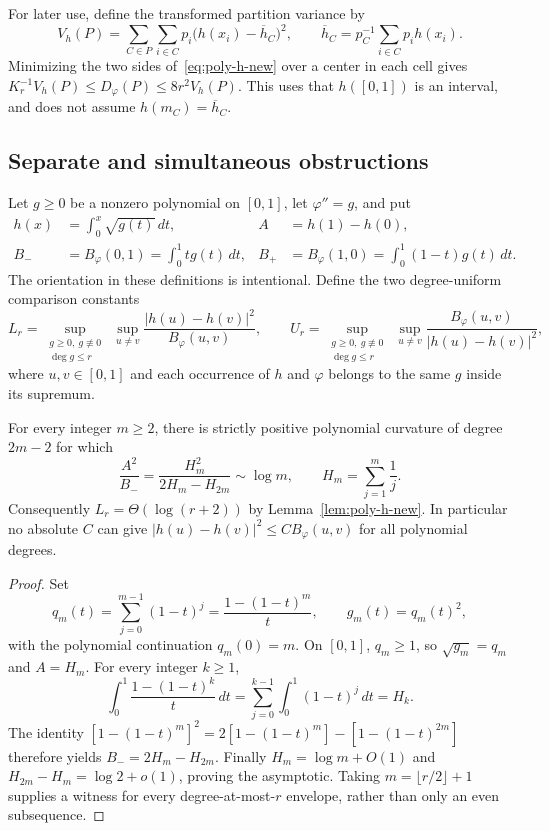 For later use, define the transformed partition variance by
\[
 V_h(P)=\sum_{C\in P}\sum_{i\in C}p_i
 \bigl(h(x_i)-\overline h_C\bigr)^2,\qquad
 \overline h_C=p_C^{-1}\sum_{i\in C}p_i h(x_i).
\]
Minimizing the two sides of~\eqref{eq:poly-h-new} over a center in
each cell gives $K_r^{-1}V_h(P)\le D_\varphi(P)\le8r^2V_h(P)$.
This uses that $h([0,1])$ is an interval, and does not assume
$h(m_C)=\overline h_C$.

\subsection{Separate and simultaneous obstructions}

Let $g\geq0$ be a nonzero polynomial on $[0,1]$, let
$\varphi''=g$, and put
\begin{align*}
 h(x)&=\int_0^x\sqrt{g(t)}\,dt,&
 A&=h(1)-h(0),\\
 B_-&=B_\varphi(0,1)=\int_0^1 t g(t)\,dt,&
 B_+&=B_\varphi(1,0)=\int_0^1(1-t)g(t)\,dt.
\end{align*}
The orientation in these definitions is intentional. Define the two
degree-uniform comparison constants
\[
 L_r=\sup_{\substack{g\geq0,\ g\not\equiv0\\\deg g\leq r}}
       \ \sup_{u\ne v}\frac{|h(u)-h(v)|^2}{B_\varphi(u,v)},
 \qquad
 U_r=\sup_{\substack{g\geq0,\ g\not\equiv0\\\deg g\leq r}}
       \ \sup_{u\ne v}\frac{B_\varphi(u,v)}{|h(u)-h(v)|^2},
\]
where $u,v\in[0,1]$ and each occurrence of $h$ and $\varphi$ belongs to
the same $g$ inside its supremum.

\begin{proposition}
For every integer $m\geq2$, there is strictly positive polynomial curvature
of degree $2m-2$ for which
\[
 \frac{A^2}{B_-}=\frac{H_m^2}{2H_m-H_{2m}}\sim\log m,
 \qquad H_m=\sum_{j=1}^m\frac1j.
\]
Consequently $L_r=\Theta(\log(r+2))$ by Lemma~\ref{lem:poly-h-new}. In particular no absolute $C$ can give
$|h(u)-h(v)|^2\leq C B_\varphi(u,v)$ for all polynomial degrees.
\end{proposition}
\begin{proof}
Set
\[
 q_m(t)=\sum_{j=0}^{m-1}(1-t)^j
       =\frac{1-(1-t)^m}{t},\qquad g_m(t)=q_m(t)^2,
\]
with the polynomial continuation $q_m(0)=m$. On $[0,1]$, $q_m\geq1$,
so $\sqrt{g_m}=q_m$ and $A=H_m$. For every integer $k\geq1$,
\[
 \int_0^1\frac{1-(1-t)^k}{t}\,dt
 =\sum_{j=0}^{k-1}\int_0^1(1-t)^j\,dt=H_k.
\]
The identity
$[1-(1-t)^m]^2=2[1-(1-t)^m]-[1-(1-t)^{2m}]$
therefore yields $B_-=2H_m-H_{2m}$. Finally
$H_m=\log m+O(1)$ and $H_{2m}-H_m=\log2+o(1)$, proving the
asymptotic. Taking $m=\lfloor r/2\rfloor+1$ supplies a witness for every
degree-at-most-$r$ envelope, rather than only an even subsequence.
\end{proof}

